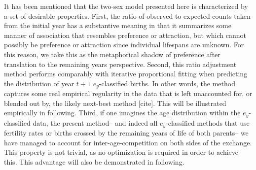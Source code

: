 
It has been mentioned that the two-sex model presented here is characterized by
a set of desirable properties. First, the ratio of observed to expected counts
taken from the initial year has a substantive meaning in that it summarizes
some manner of association that resembles preference or attraction, but which
cannot possibly be preference or attraction since individual lifespans are
unknown. For this reason, we take this as the metaphorical shadow of preference
after translation to the remaining years perspective. Second, this ratio adjustment 
method performs comparably with iterative proportional fitting when
predicting the distribution of year $t+1$ $e_y$-classified births. In other words, 
the method captures some real empirical regularity in the data that is left unaccounted 
for, or blended out by, the likely next-best method [cite]. This will be illustrated
 empirically in following. Third, if one imagines the age distribution within the
  $e_y$-classified data, the present method-- and indeed
all $e_y$-classified methods that use fertility rates or births crossed by the
remaining years of life of both parents-- we have managed to account for
inter-age-competition on both sides of the exchange. This property is not
trivial, as no optimization is required in order to achieve this. This advantage
will also be demonstrated in following.









